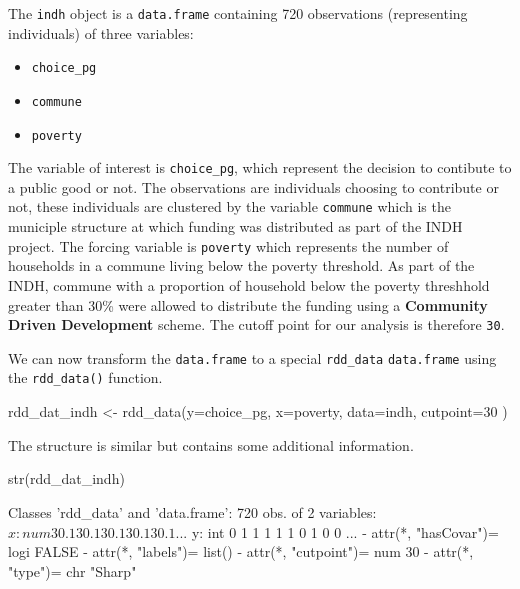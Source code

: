 \documentclass[article]{jss}
\begin{document}
The \texttt{indh} object is a \texttt{data.frame} containing 720
observations (representing individuals) of three variables:

\begin{itemize}
\itemsep1pt\parskip0pt
\item
  \texttt{choice\_pg}
\item
  \texttt{commune}
\item
  \texttt{poverty}
\end{itemize}

The variable of interest is \texttt{choice\_pg}, which represent the
decision to contibute to a public good or not. The observations are
individuals choosing to contribute or not, these individuals are
clustered by the variable \texttt{commune} which is the municiple
structure at which funding was distributed as part of the INDH project.
The forcing variable is \texttt{poverty} which represents the number of
households in a commune living below the poverty threshold. As part of
the INDH, commune with a proportion of household below the poverty
threshhold greater than 30\% were allowed to distribute the funding
using a \textbf{Community Driven Development} scheme. The cutoff point
for our analysis is therefore \texttt{30}.

We can now transform the \texttt{data.frame} to a special
\texttt{rdd\_data} \texttt{data.frame} using the \texttt{rdd\_data()}
function.

\begin{CodeChunk}
\begin{CodeInput}
rdd_dat_indh <- rdd_data(y=choice_pg,
                         x=poverty,
                         data=indh,
                         cutpoint=30 )
\end{CodeInput}
\end{CodeChunk}

The structure is similar but contains some additional information.

\begin{CodeChunk}
\begin{CodeInput}
str(rdd_dat_indh)
\end{CodeInput}
\begin{CodeOutput}
Classes 'rdd_data' and 'data.frame':    720 obs. of  2 variables:
 $ x: num  30.1 30.1 30.1 30.1 30.1 ...
 $ y: int  0 1 1 1 1 1 0 1 0 0 ...
 - attr(*, "hasCovar")= logi FALSE
 - attr(*, "labels")= list()
 - attr(*, "cutpoint")= num 30
 - attr(*, "type")= chr "Sharp"
\end{CodeOutput}
\end{CodeChunk}
\end{document}
